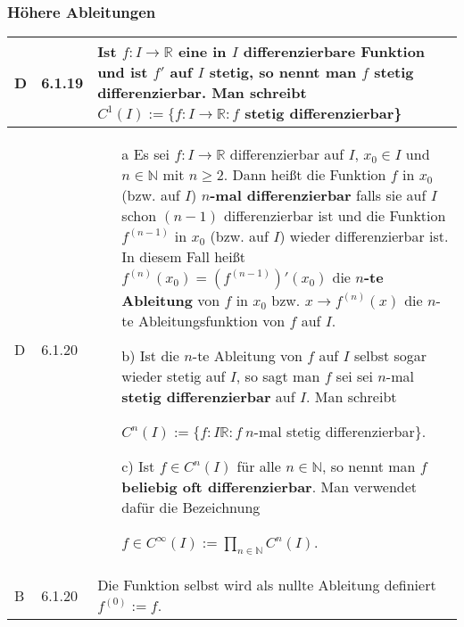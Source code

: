 \subsubsection{Höhere Ableitungen}
      
    \begin{longtable}{p{0.75cm} p{1cm} p{16cm}}
        \toprule

        D   & 6.1.19&   Ist $f: I \rightarrow \mathbb{R}$ eine in $I$ differenzierbare Funktion und ist $f'$ auf $I$ stetig, so nennt man
                        $f$ \textbf{stetig differenzierbar}. Man schreibt $C^1(I) := \{ f:I \rightarrow \mathbb{R}: f$ stetig differenzierbar\} \\
        \midrule
        D   & 6.1.20&   \begin{itemize}[topsep=-0.5cm]
                            \item[a] Es sei $f: I \rightarrow \mathbb{R}$ differenzierbar auf $I$, $x_0 \in I$ und $n \in \mathbb{N}$ mit
                                        $n \geq 2$. Dann heißt die Funktion $f$ in $x_0$ (bzw. auf $I$) \textbf{$n$-mal differenzierbar}
                                        falls sie auf $I$ schon $(n-1)$ differenzierbar ist und die Funktion $f^{(n-1)}$ in $x_0$
                                        (bzw. auf $I$) wieder differenzierbar ist. \hfill \break
                                        In diesem Fall heißt $f^{(n)}(x_0) = (f^{(n-1)})'(x_0)$ die \textbf{$n$-te Ableitung} von $f$ in
                                        $x_0$ bzw. $x \rightarrow f^{(n)}(x)$ die $n$-te Ableitungsfunktion von $f$ auf $I$. 
                            \item[b)] Ist die $n$-te Ableitung von $f$ auf $I$ selbst sogar wieder stetig auf $I$, so sagt man $f$ sei
                                        sei $n$-mal \textbf{stetig differenzierbar} auf $I$. Man schreibt \hfill \break
                                        \centerline{$ C^n(I) := \{ f: I \mathbb{R}: f~n$-mal stetig differenzierbar\}.}
                            \item[c)] Ist $f\in C^n(I)$ für alle $n \in \mathbb{N}$, so nennt man $f$ \textbf{beliebig oft differenzierbar}.
                                        Man verwendet dafür die Bezeichnung \hfill \break
                                        \centerline{$f \in C^{\infty}(I) := \prod_{n \in \mathbb{N}} C^n(I)$.}
                        \end{itemize} \vspace{-0cm} \\
        \midrule
        B   & 6.1.20&   Die Funktion selbst wird als nullte Ableitung definiert $f^{(0)} := f$. \\
        \bottomrule

    \end{longtable}


